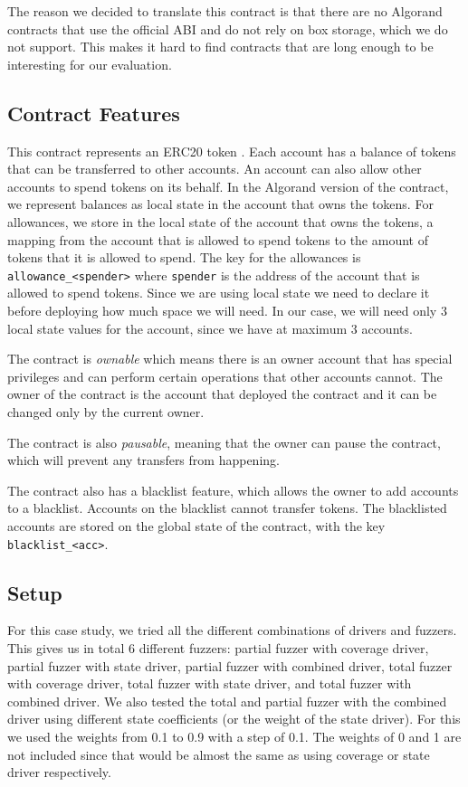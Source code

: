 The reason we decided to translate this contract is that there are no Algorand contracts that use the official \ac{ABI} and do not rely on box storage, which we do not support.
This makes it hard to find contracts that are long enough to be interesting for our evaluation.

\subsection*{Contract Features}
This contract represents an ERC20 token \cite{noauthor_erc-20_nodate}.
Each account has a balance of tokens that can be transferred to other accounts.
An account can also allow other accounts to spend tokens on its behalf.
In the Algorand version of the contract, we represent balances as local state in the account that owns the tokens.
For allowances, we store in the local state of the account that owns the tokens, a mapping from the account that is allowed to spend tokens to the amount of tokens that it is allowed to spend.
The key for the allowances is \texttt{allowance\_<spender>} where \texttt{spender} is the address of the account that is allowed to spend tokens.
Since we are using local state we need to declare it before deploying how much space we will need.
In our case, we will need only 3 local state values for the account, since we have at maximum 3 accounts.

The contract is \emph{ownable} which means there is an owner account that has special privileges and can perform certain operations that other accounts cannot.
The owner of the contract is the account that deployed the contract and it can be changed only by the current owner.

The contract is also \emph{pausable}, meaning that the owner can pause the contract, which will prevent any transfers from happening.

The contract also has a blacklist feature, which allows the owner to add accounts to a blacklist.
Accounts on the blacklist cannot transfer tokens.
The blacklisted accounts are stored on the global state of the contract, with the key \texttt{blacklist\_<acc>}.

\subsection*{Setup}
For this case study, we tried all the different combinations of drivers and fuzzers.
This gives us in total 6 different fuzzers: partial fuzzer with coverage driver, partial fuzzer with state driver, partial fuzzer with combined driver, total fuzzer with coverage driver, total fuzzer with state driver, and total fuzzer with combined driver.
We also tested the total and partial fuzzer with the combined driver using different state coefficients (or the weight of the state driver).
For this we used the weights from 0.1 to 0.9 with a step of 0.1.
The weights of 0 and 1 are not included since that would be almost the same as using coverage or state driver respectively.

